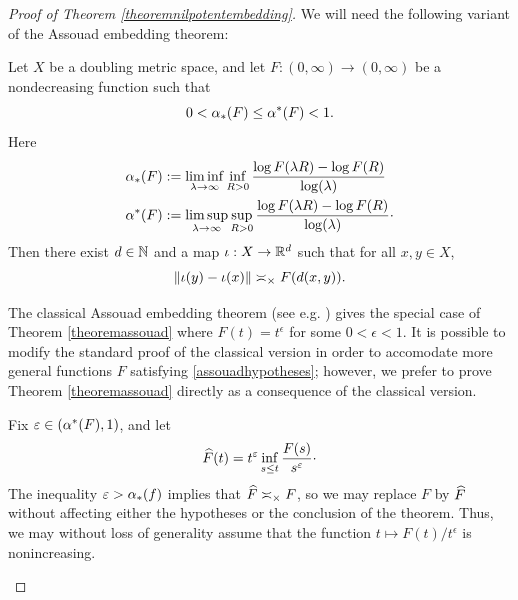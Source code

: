 \begin{proof}[Proof of Theorem \ref{theoremnilpotentembedding}]
We will need the following variant of the Assouad embedding theorem:





\begin{theorem}
\label{theoremassouad}
Let $X$ be a doubling metric space, and let $F:(0,\infty)\to(0,\infty)$ be a nondecreasing function such that
\begin{equation}
\label{assouadhypotheses}
0 < \alpha_*(F) \leq \alpha^*(F) < 1.
\end{equation}
Here
\begin{align*}
\alpha_*(F) &:= \liminf_{\lambda\to\infty} \inf_{R > 0} \frac{\log F(\lambda R) - \log F(R)}{\log(\lambda)}\\
\alpha^*(F) &:= \limsup_{\lambda\to\infty} \sup_{R > 0} \frac{\log F(\lambda R) - \log F(R)}{\log(\lambda)}\cdot
\end{align*}
Then there exist $d\in\N$ and a map $\iota:X\to\R^d$ such that for all $x,y\in X$,
\begin{equation}
\label{assouad}
\|\iota(y) - \iota(x)\| \asymp_\times F(d(x,y)).
\end{equation}
\end{theorem}
\begin{subproof}
The classical Assouad embedding theorem (see e.g. \cite[Theorem 12.2]{Heinonen}) gives the special case of Theorem \ref{theoremassouad} where $F(t) = t^\epsilon$ for some $0 < \epsilon < 1$. It is possible to modify the standard proof of the classical version in order to accomodate more general functions $F$ satisfying \eqref{assouadhypotheses}; however, we prefer to prove Theorem \ref{theoremassouad} directly as a consequence of the classical version.

Fix $\varepsilon \in (\alpha^*(F),1)$, and let
\[
\widehat F(t) = t^\varepsilon \inf_{s \leq t} \frac{F(s)}{s^\varepsilon}\cdot
\]
The inequality $\varepsilon > \alpha_*(f)$ implies that $\widehat F\asymp_\times F$, so we may replace $F$ by $\widehat F$ without affecting either the hypotheses or the conclusion of the theorem. Thus, we may without loss of generality assume that the function $t\mapsto F(t)/t^\epsilon$ is nonincreasing.


\end{subproof}
\end{proof}
